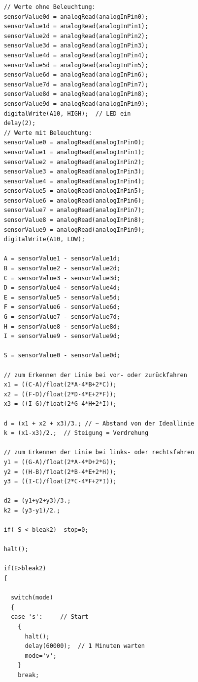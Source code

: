 \documentclass[a4paper,bibtotoc,oneside]{scrbook}
\begin{document}
\begin{appendix}
\begin{verbatim}
    // Werte ohne Beleuchtung:
    sensorValue0d = analogRead(analogInPin0);   
    sensorValue1d = analogRead(analogInPin1);  
    sensorValue2d = analogRead(analogInPin2);  
    sensorValue3d = analogRead(analogInPin3);  
    sensorValue4d = analogRead(analogInPin4);  
    sensorValue5d = analogRead(analogInPin5);  
    sensorValue6d = analogRead(analogInPin6);  
    sensorValue7d = analogRead(analogInPin7);  
    sensorValue8d = analogRead(analogInPin8);  
    sensorValue9d = analogRead(analogInPin9);  
    digitalWrite(A10, HIGH);  // LED ein
    delay(2); 
    // Werte mit Beleuchtung:
    sensorValue0 = analogRead(analogInPin0);   
    sensorValue1 = analogRead(analogInPin1);  
    sensorValue2 = analogRead(analogInPin2);  
    sensorValue3 = analogRead(analogInPin3);  
    sensorValue4 = analogRead(analogInPin4);  
    sensorValue5 = analogRead(analogInPin5);  
    sensorValue6 = analogRead(analogInPin6);  
    sensorValue7 = analogRead(analogInPin7);  
    sensorValue8 = analogRead(analogInPin8);  
    sensorValue9 = analogRead(analogInPin9);  
    digitalWrite(A10, LOW);

    A = sensorValue1 - sensorValue1d;
    B = sensorValue2 - sensorValue2d;
    C = sensorValue3 - sensorValue3d;
    D = sensorValue4 - sensorValue4d;
    E = sensorValue5 - sensorValue5d;
    F = sensorValue6 - sensorValue6d;
    G = sensorValue7 - sensorValue7d;
    H = sensorValue8 - sensorValue8d;
    I = sensorValue9 - sensorValue9d;

    S = sensorValue0 - sensorValue0d;

    // zum Erkennen der Linie bei vor- oder zurückfahren 
    x1 = ((C-A)/float(2*A-4*B+2*C));
    x2 = ((F-D)/float(2*D-4*E+2*F));
    x3 = ((I-G)/float(2*G-4*H+2*I));

    d = (x1 + x2 + x3)/3.; // ~ Abstand von der Ideallinie
    k = (x1-x3)/2.;  // Steigung = Verdrehung

    // zum Erkennen der Linie bei links- oder rechtsfahren
    y1 = ((G-A)/float(2*A-4*D+2*G));
    y2 = ((H-B)/float(2*B-4*E+2*H));
    y3 = ((I-C)/float(2*C-4*F+2*I));

    d2 = (y1+y2+y3)/3.;
    k2 = (y3-y1)/2.;

    if( S < bleak2) _stop=0;

    halt();

    if(E>bleak2)
    {

      switch(mode)
      {
      case 's':     // Start
        { 
          halt();
          delay(60000);  // 1 Minuten warten
          mode='v';
        }
        break;


\end{verbatim}
\end{appendix}
\end{document}
